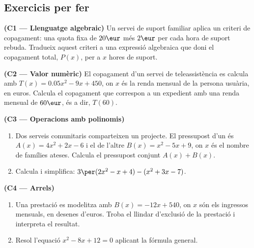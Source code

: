 \subsection{Exercicis per fer}

\begin{exercicis}
\begin{exlist}

  \item \textbf{(C1 — Llenguatge algebraic)} Un servei de suport
        familiar aplica un criteri de copagament: una quota fixa de
        $20\eur$ més $2\eur$ per cada hora de suport rebuda. Tradueix
        aquest criteri a una expressió algebraica que doni el
        copagament total, $P(x)$, per a $x$ hores de suport.
  \vspace{3cm}

  \item \textbf{(C2 — Valor numèric)} El copagament d'un servei de
        teleassistència es calcula amb $T(x)=\num{0,05}x^2-9x+450$, on
        $x$ és la renda mensual de la persona usuària, en euros.
        Calcula el copagament que correspon a un expedient amb una
        renda mensual de $60\eur$, és a dir, $T(60)$.
  \vspace{3cm}

  \item \textbf{(C3 — Operacions amb polinomis)}
    \begin{enumerate}[label=\alph*), leftmargin=1.6em, topsep=2pt]
      \item Dos serveis comunitaris comparteixen un projecte. El
            pressupost d'un és $A(x)=4x^2+2x-6$ i el de l'altre
            $B(x)=x^2-5x+9$, on $x$ és el nombre de famílies ateses.
            Calcula el pressupost conjunt $A(x)+B(x)$.
      \item Calcula i simplifica: $3\per(2x^2-x+4)-(x^2+3x-7)$.
    \end{enumerate}
  \vspace{3cm}

  \item \textbf{(C4 — Arrels)}
    \begin{enumerate}[label=\alph*), leftmargin=1.6em, topsep=2pt]
      \item Una prestació es modelitza amb $B(x)=-12x+540$, on $x$ són
            els ingressos mensuals, en desenes d'euros. Troba el
            llindar d'exclusió de la prestació i interpreta el
            resultat.
      \item Resol l'equació $x^2-8x+12=0$ aplicant la fórmula general.
    \end{enumerate}
  \vspace{3cm}

\end{exlist}
\end{exercicis}

